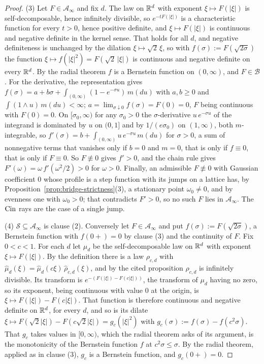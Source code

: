 \begin{proof}
(3) Let $F \in \mathcal{A}_\infty$ and fix $d$. The law on $\mathbb{R}^d$ with exponent
$\xi \mapsto F(|\xi|)$ is self-decomposable, hence infinitely divisible, so $e^{-tF(|\xi|)}$ is
a characteristic function for every $t > 0$, hence positive definite, and $\xi \mapsto F(|\xi|)$
is continuous and negative definite in the kernel sense. That holds for all $d$, and negative
definiteness is unchanged by the dilation $\xi \mapsto \sqrt2\,\xi$, so with
$f(\sigma) := F(\sqrt{2\sigma})$ the function $\xi \mapsto f(|\xi|^2) = F(\sqrt2\,|\xi|)$ is
continuous and negative definite on every $\mathbb{R}^d$. By the radial
theorem $f$ is a Bernstein function on $(0,\infty)$, and
$F \in \mathcal{B}$. For the derivative, the representation gives
$f(\sigma) = a + b\sigma + \int_{(0,\infty)}(1 - e^{-\sigma u})\,m(du)$ with $a, b \ge 0$ and
$\int (1 \wedge u)\,m(du) < \infty$; $a = \lim_{\sigma \downarrow 0} f(\sigma) = F(0) = 0$, $F$
being continuous with $F(0) = 0$. On $[\sigma_0,\infty)$ for any $\sigma_0 > 0$ the
$\sigma$-derivative $u\,e^{-\sigma u}$ of the integrand is dominated by $u$ on $(0,1]$ and by
$1/(e\sigma_0)$ on $(1,\infty)$, both $m$-integrable, so
$f'(\sigma) = b + \int_{(0,\infty)} u\,e^{-\sigma u}\,m(du)$ for $\sigma > 0$, a sum of
nonnegative terms that vanishes only if $b = 0$ and $m = 0$, that is only if $f \equiv 0$, that is
only if $F \equiv 0$. So $F \not\equiv 0$ gives $f' > 0$, and the chain rule gives
$F'(\omega) = \omega\,f'(\omega^2/2) > 0$ for $\omega > 0$. Finally, an admissible $F \not\equiv 0$
with Gaussian coefficient $0$ whose profile is a step function with its jumps on a lattice has, by
Proposition~\ref{prop:bridge-strictness}(3), a stationary point $\omega_0 \ne 0$, and by evenness one with
$\omega_0 > 0$; that contradicts $F' > 0$, so no such $F$ lies in $\mathcal{A}_\infty$. The
$\operatorname{Cin}$ rays are the case of a single jump.

(4) $\mathcal{S} \subseteq \mathcal{A}_\infty$ is clause (2). Conversely let
$F \in \mathcal{A}_\infty$ and put $f(\sigma) := F(\sqrt{2\sigma})$, a Bernstein function with
$f(0{+}) = 0$ by clause (3) and the continuity of $F$. Fix $0 < c < 1$. For each $d$ let $\mu_d$
be the self-decomposable law on $\mathbb{R}^d$ with exponent $\xi \mapsto F(|\xi|)$. By the definition
there is a law $\rho_{c,d}$ with $\hat\mu_d(\xi) = \hat\mu_d(c\xi)\,\hat\rho_{c,d}(\xi)$, and by
the cited proposition $\rho_{c,d}$ is infinitely divisible. Its transform is
$e^{-(F(|\xi|) - F(c|\xi|))}$, the transform of $\mu_d$ having no zero, so its exponent, being
continuous with value $0$ at the origin, is $\xi \mapsto F(|\xi|) - F(c|\xi|)$. That function
is therefore continuous and negative definite on $\mathbb{R}^d$, for every $d$, and so is its dilate
$\xi \mapsto F(\sqrt2|\xi|) - F(c\sqrt2|\xi|) = g_c(|\xi|^2)$ with
$g_c(\sigma) := f(\sigma) - f(c^2\sigma)$. That $g_c$ takes values in $[0,\infty)$, which the
radial theorem asks of its argument, is the monotonicity of the Bernstein function $f$ at
$c^2\sigma \le \sigma$. By the radial theorem, applied as in clause (3),
$g_c$ is a Bernstein function, and $g_c(0{+}) = 0$.


\end{proof}
